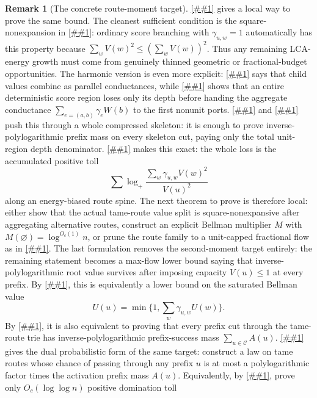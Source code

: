 \documentclass[10pt]{article}
\newcommand{\cref}[1]{\ref{##1}}
\newcommand{\Cref}[1]{\ref{##1}}
\theoremstyle{definition}
\newtheorem{remark}[theorem]{Remark}
\begin{document}
\begin{remark}[The concrete route-moment target]
   \Cref{lem:local-lca-energy} gives a local way to prove the same bound. The
   cleanest sufficient condition is the square-nonexpansion in
   \cref{cor:square-nonexpansive-routes}: ordinary score branching with
   $\gamma_{u,w}=1$ automatically has this property because
   $\sum_wV(w)^2\le(\sum_wV(w))^2$. Thus any remaining LCA-energy growth must
   come from genuinely thinned geometric or fractional-budget opportunities.
   The harmonic version is even more explicit:
   \cref{lem:harmonic-resistance-normal-form} says that child values combine as
   parallel conductances, while
   \cref{lem:ported-unit-region-contraction} shows that an entire
   deterministic score region loses only its depth before handing the aggregate
   conductance \(\sum_{e=(a,b)}\gamma_eW(b)\) to the first nonunit ports.
   \Cref{lem:port-skeleton-saturated-comparison} and
   \cref{cor:skeleton-cut-conductance} push this through a whole compressed
   skeleton: it is enough to prove inverse-polylogarithmic prefix mass on every
   skeleton cut, paying only the total unit-region depth denominator.
   \Cref{lem:energy-spine-toll} makes this exact: the whole loss is the
   accumulated positive toll
   \[
      \sum\log_+
      \frac{\sum_w\gamma_{u,w}V(w)^2}{V(u)^2}
   \]
   along an energy-biased route spine. The next theorem to prove is therefore
   local: either show that the actual tame-route value split is
   square-nonexpansive after aggregating alternative routes, construct an
   explicit Bellman multiplier $M$ with $M(\varnothing)=\log^{O_c(1)}n$, or
   prune the route family to a unit-capped fractional flow as in
   \cref{lem:unit-capped-value-flow}. The last formulation removes the
   second-moment target entirely: the remaining statement becomes a max-flow
   lower bound saying that inverse-polylogarithmic root value survives after
   imposing capacity $V(u)\le1$ at every prefix. By
   \cref{lem:saturated-value-recursion}, this is equivalently a lower bound on
   the saturated Bellman value
   \[
      U(u)=\min\{1,\sum_w\gamma_{u,w}U(w)\}.
   \]
   By \cref{lem:saturated-value-mincut}, it is also equivalent to proving that
   every prefix cut through the tame-route trie has inverse-polylogarithmic
   prefix-success mass $\sum_{u\in\mathcal C}A(u)$.
   \Cref{lem:dominated-route-law} gives the dual probabilistic form of the same
   target: construct a law on tame routes whose chance of passing through any
   prefix $u$ is at most a polylogarithmic factor times the activation prefix
   mass $A(u)$. Equivalently, by \cref{cor:route-law-toll}, prove only
   $O_c(\log\log n)$ positive domination toll

\end{remark}
\end{document}
